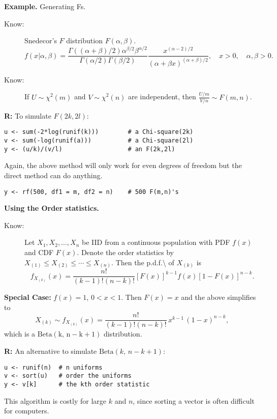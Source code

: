 \documentclass[captions=tableheading]{scrbook}
\begin{document}
\begin{itemize}
\textbf{Example.} Generating Fs.


\begin{description}
\item[Know:] Snedecor's $F$ distribution $F(\alpha,\beta)$.
  \[
  f(x|\alpha,\beta)=\frac{\Gamma((\alpha+\beta)/2)\alpha^{\beta/2}\beta^{\alpha/2}}{\Gamma(\alpha/2)\Gamma(\beta/2)}\frac{x^{(\alpha-2)/2}}{(\alpha+\beta x)^{(\alpha+\beta)/2}},\quad x>0,\quad\alpha,\beta>0.
  \]
\item[Know:] If $U\sim\chi^{2}(m)$ and $V\sim\chi^{2}(n)$ are independent, then $\frac{U/m}{V/n}\sim F(m,n)$.
\end{description}

\textbf{R:} To simulate $F(2k,2l)$:
\begin{verbatim}
u <- sum(-2*log(runif(k)))        # a Chi-square(2k)
v <- sum(-log(runif(a)))          # a Chi-square(2l)
y <- (u/k)/(v/l)                  # an F(2k,2l)
\end{verbatim}

Again, the above method will only work for even degrees of freedom but the direct method can do anything.
\begin{verbatim}
y <- rf(500, df1 = m, df2 = n)    # 500 F(m,n)'s
\end{verbatim}
 


\textbf{Using the Order statistics.}


\begin{description}
\item[Know:] Let $X_{1},X_{2},\ldots,X_{n}$ be IID from a continuous population with PDF $f(x)$ and CDF $F(x)$. Denote the order statistics by $X_{(1)}\leq X_{(2)}\leq\cdots\leq X_{(n)}$. Then the p.d.f.\textbackslash{} of $X_{(k)}$ is 
  \[
  f_{X_{(k)}}(x)=\frac{n!}{(k-1)!(n-k)!}[F(x)]^{k-1}f(x)[1-F(x)]^{n-k}.
  \]
\end{description}
\textbf{Special Case:} $f(x)=1$, $0 < x < 1$.   Then $F(x)=x$ and the above simplifies to 
\[
X_{(k)}\sim f_{X_{(k)}}(x)=\frac{n!}{(k-1)!(n-k)!}\, x^{k-1}\,(1-x)^{n-k},
\]
which is a $\mathrm{Beta(k,\,n-k+1)}$ distribution.

\textbf{R:} An alternative to simulate $\mathrm{Beta}(k,\,n-k+1)$:

\begin{verbatim}
u <- runif(n)  # n uniforms
v <- sort(u)   # order the uniforms
y <- v[k]      # the kth order statistic
\end{verbatim}

This algorithm is costly for large $k$ and $n$, since sorting a vector is often difficult for computers.



\end{itemize}
\end{document}
